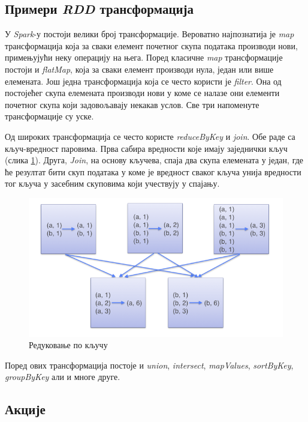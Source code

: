 \documentclass[12pt,oneside]{memoir}
\begin{document}
\subsection{Примери \textit{RDD} трансформација}
\label{subsec:spark_transformation_types}

У \textit{Spark}-у постоји велики број трансформације. Вероватно најпознатија је \textit{map} трансформација која за сваки елемент почетног скупа података производи нови, примењујући неку операцију на њега. Поред класичне \textit{map} трансформације постоји и  \textit{flatMap}, која за сваки елемент производи нула, један или више елемената. Још једна трансформација која се често користи је \textit{filter}. Она од постојећег скупа елемената производи нови у коме се налазе они елементи почетног скупа који задовољавају некакав услов. Све три напоменуте трансформације су уске.

Од широких трансформација се често користе \textit{reduceByKey} и \textit{join}. Обе раде са кључ-вредност паровима. Прва сабира вредности које имају заједнички кључ (слика \ref{fig:sprk_red_by_key}). Друга, \textit{Join}, на основу кључева, спаја два скупа елемената у један, где ће резултат бити скуп података у коме је вредност сваког кључа унија вредности тог кључа у засебним скуповима који учествују у спајању.

\begin{figure}[!ht]
  \centering
  \includegraphics[width=1\textwidth]{pictures/spark_reduce_by_key.png}
  \caption{Редуковање по кључу}
  \label{fig:sprk_red_by_key}
\end{figure}

Поред ових трансформација постоје и \textit{union}, \textit{intersect}, \textit{mapValues}, \textit{sortByKey}, \textit{groupByKey} али и многе друге. \cite{spark_rdd}

\subsection{Акције}
\label{subsec:spark_akc}
\end{document}
